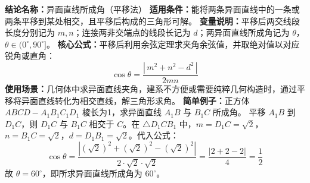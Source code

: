 \textbf{结论名称：}异面直线所成角（平移法）  
\textbf{适用条件：}能将两条异面直线中的一条或两条平移到某处相交，且平移后构成的三角形可解。  
\textbf{变量说明：}平移后两交线段长度分别记为 \(m,n\)；连接两非交端点的线段长记为 \(d\)；两异面直线所成角记为 \(\theta\)，\(\theta\in(0^\circ,90^\circ]\)。  
\textbf{核心公式：}平移后利用余弦定理求夹角余弦值，并取绝对值以对应锐角或直角：
\[
\boxed{\cos\theta = \frac{|\,m^{2}+n^{2}-d^{2}\,|}{2mn}}
\]  
\textbf{使用场景：}几何体中求异面直线夹角，建系不方便或需要纯粹几何构造时，通过平移将异面直线转化为相交直线，解三角形求角。  
\textbf{简单例子：}正方体 \(ABCD-A_1B_1C_1D_1\) 棱长为1，求异面直线 \(A_1B\) 与 \(B_1C\) 所成角。  
平移 \(A_1B\) 到 \(D_1C\)，则 \(D_1C\) 与 \(B_1C\) 相交于 \(C\)。在 \(\triangle D_1CB_1\) 中，\(m=D_1C=\sqrt{2}\)，\(n=B_1C=\sqrt{2}\)，\(d=D_1B_1=\sqrt{2}\)。代入公式：
\[
\cos\theta=\frac{|(\sqrt{2})^{2}+(\sqrt{2})^{2}-(\sqrt{2})^{2}|}{2\cdot\sqrt{2}\cdot\sqrt{2}}=\frac{|2+2-2|}{4}=\frac{1}{2}
\]
故 \(\theta=60^\circ\)，即所求异面直线所成角为 \(60^\circ\)。